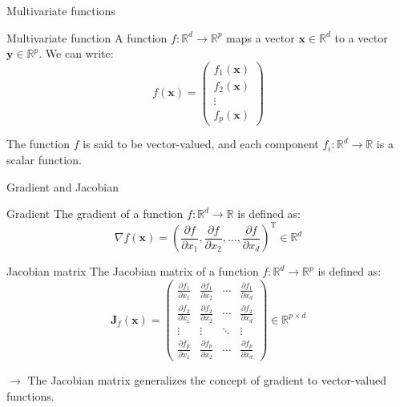 \documentclass[aspectratio=1610]{beamer}
\begin{document}
\begin{frame}{Multivariate functions}
  \begin{block}{Multivariate function}
    A function $f:\mathbb{R}^d \to \mathbb{R}^p$ maps a vector $\mathbf{x} \in \mathbb{R}^d$ to a vector $\mathbf{y} \in \mathbb{R}^p$. We can write:
    $$f(\mathbf{x}) = \begin{pmatrix}
      f_1(\mathbf{x}) \\
      f_2(\mathbf{x}) \\
      \vdots \\
      f_p(\mathbf{x})
    \end{pmatrix}$$
  \end{block}
  The function $f$ is said to be vector-valued, and each component $f_i:\mathbb{R}^d \to \mathbb{R}$ is a scalar function.
\end{frame}

\begin{frame}{Gradient and Jacobian}
  \begin{block}{Gradient}
    The gradient of a function $f:\mathbb{R}^d \to \mathbb{R}$ is defined as:
    $$\nabla f(\mathbf{x}) = \left( \frac{\partial f}{\partial x_1}, \frac{\partial f}{\partial x_2}, \ldots, \frac{\partial f}{\partial x_d} \right)^\mathrm{T} \in \mathbb{R}^d$$
  \end{block}
  \begin{block}{Jacobian matrix}
    The Jacobian matrix of a function $f:\mathbb{R}^d \to \mathbb{R}^p$ is defined as:
    $$\mathbf{J}_f(\mathbf{x}) = \begin{pmatrix}
      \frac{\partial f_1}{\partial x_1} & \frac{\partial f_1}{\partial x_2} & \cdots & \frac{\partial f_1}{\partial x_d} \\
      \frac{\partial f_2}{\partial x_1} & \frac{\partial f_2}{\partial x_2} & \cdots & \frac{\partial f_2}{\partial x_d} \\
      \vdots & \vdots & \ddots & \vdots \\
      \frac{\partial f_p}{\partial x_1} & \frac{\partial f_p}{\partial x_2} & \cdots & \frac{\partial f_p}{\partial x_d}
    \end{pmatrix} \in \mathbb{R}^{p \times d}$$
  \end{block}
  $\rightarrow$ The Jacobian matrix generalizes the concept of gradient to vector-valued functions.
\end{frame}
\end{document}
